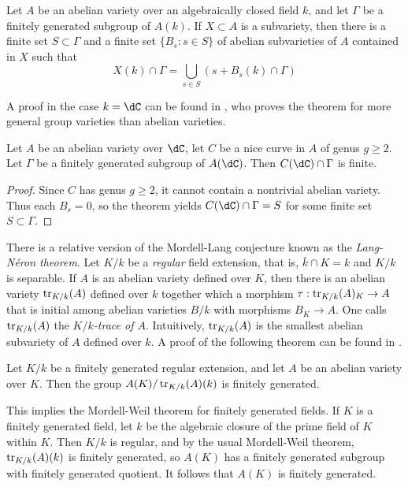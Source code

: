 \documentclass{article}
\begin{document}
\begin{theorem}[Faltings]
Let $A$ be an abelian variety over an algebraically closed field $k$, and let 
$\Gamma$ be a finitely generated subgroup of $A(k)$. If $X\subset A$ is a 
subvariety, then there is a finite set $S\subset \Gamma$ and a finite set 
$\{B_s:s\in S\}$ of abelian subvarieties of $A$ contained in $X$ such that 
\[
  X(k)\cap \Gamma = \bigcup_{s\in S} \left(s+ B_s(k)\cap \Gamma\right)
\]
\end{theorem}
A proof in the case $k=\dC$ can be found in \cite{mc95}, who proves the theorem 
for more general group varieties than abelian varieties. 

\begin{corollary}
Let $A$ be an abelian variety over $\dC$, let $C$ be a nice curve in $A$ of 
genus $g\geqslant 2$. Let $\Gamma$ be a finitely generated subgroup of 
$A(\dC)$. Then $C(\dC)\cap \Gamma$ is finite. 
\end{corollary}
\begin{proof}
Since $C$ has genus $g\geqslant 2$, it cannot contain a nontrivial abelian 
variety. Thus each $B_s = 0$, so the theorem yields $C(\dC)\cap \Gamma = S$ 
for some finite set $S\subset \Gamma$. 
\end{proof}

There is a relative version of the Mordell-Lang conjecture known as the 
\emph{Lang-N\'eron theorem}. Let $K/k$ be a \emph{regular} field extension, 
that is, $\bar k\cap K = k$ and $K/k$ is separable. If $A$ is an abelian 
variety defined over $K$, then there is an abelian variety 
$\operatorname{tr}_{K/k}(A)$ defined over $k$ together which a morphism 
$\tau:\operatorname{tr}_{K/k}(A)_K\to A$ that is initial among abelian 
varieties $B/k$ with morphisms $B_K\to A$. One calls 
$\operatorname{tr}_{K/k}(A)$ the \emph{$K/k$-trace of $A$}. Intuitively, 
$\operatorname{tr}_{K/k}(A)$ is the smallest abelian subvariety of $A$ defined 
over $k$. A proof of the following theorem can be found in \cite{co06}. 

\begin{theorem}
Let $K/k$ be a finitely generated regular extension, and let $A$ be an abelian 
variety over $K$. Then the group $A(K)/\operatorname{tr}_{K/k}(A)(k)$ is 
finitely generated.
\end{theorem}

This implies the Mordell-Weil theorem for finitely generated fields. If $K$ is 
a finitely generated field, let $k$ be the algebraic closure of the prime field 
of $K$ within $K$. Then $K/k$ is regular, and by the usual Mordell-Weil 
theorem, $\operatorname{tr}_{K/k}(A)(k)$ is finitely generated, so $A(K)$ has a 
finitely generated subgroup with finitely generated quotient. It follows that 
$A(K)$ is finitely generated.
\end{document}
